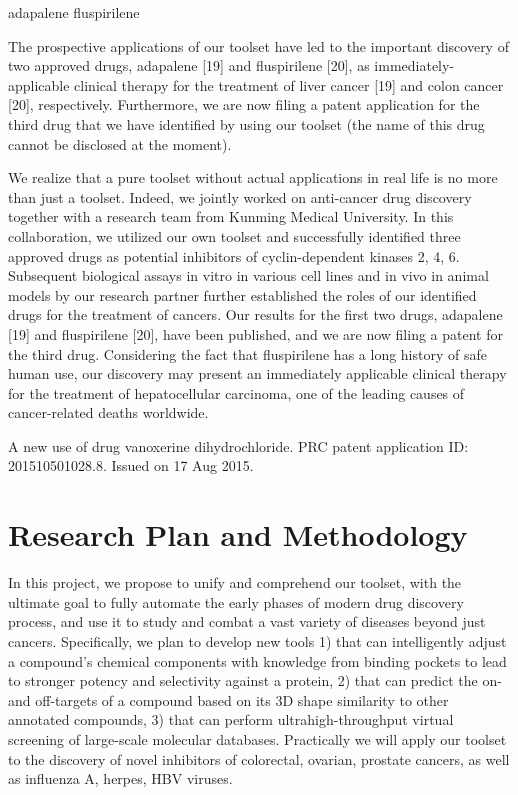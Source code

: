 \documentclass[a4paper,12pt]{article}
\begin{document}
adapalene
fluspirilene \cite{1606}

The prospective applications of our toolset have led to the important discovery of two approved drugs, adapalene [19] and fluspirilene [20], as immediately-applicable clinical therapy for the treatment of liver cancer [19] and colon cancer [20], respectively. Furthermore, we are now filing a patent application for the third drug that we have identified by using our toolset (the name of this drug cannot be disclosed at the moment). 

We realize that a pure toolset without actual applications in real life is no more than just a toolset. Indeed, we jointly worked on anti-cancer drug discovery together with a research team from Kunming Medical University. In this collaboration, we utilized our own toolset and successfully identified three approved drugs as potential inhibitors of cyclin-dependent kinases 2, 4, 6. Subsequent biological assays in vitro in various cell lines and in vivo in animal models by our research partner further established the roles of our identified drugs for the treatment of cancers. Our results for the first two drugs, adapalene [19] and fluspirilene [20], have been published, and we are now filing a patent for the third drug. Considering the fact that fluspirilene has a long history of safe human use, our discovery may present an immediately applicable clinical therapy for the treatment of hepatocellular carcinoma, one of the leading causes of cancer-related deaths worldwide.

A new use of drug vanoxerine dihydrochloride. PRC patent application ID: 201510501028.8. Issued on 17 Aug 2015.

\section*{Research Plan and Methodology}

In this project, we propose to unify and comprehend our toolset, with the ultimate goal to fully automate the early phases of modern drug discovery process, and use it to study and combat a vast variety of diseases beyond just cancers. Specifically, we plan to develop new tools 1) that can intelligently adjust a compound’s chemical components with knowledge from binding pockets to lead to stronger potency and selectivity against a protein, 2) that can predict the on- and off-targets of a compound based on its 3D shape similarity to other annotated compounds, 3) that can perform ultrahigh-throughput virtual screening of large-scale molecular databases. Practically we will apply our toolset to the discovery of novel inhibitors of colorectal, ovarian, prostate cancers, as well as influenza A, herpes, HBV viruses.
\end{document}
